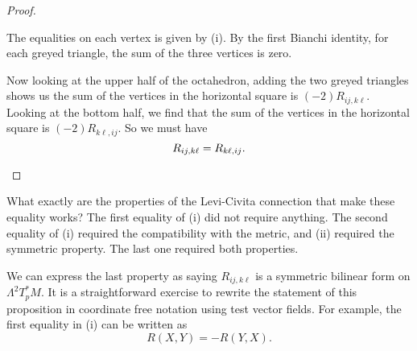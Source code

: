 \documentclass[a4paper]{article}
\begin{document}
\begin{proof}
\begin{enumerate}
\begin{center}
      \end{center}
      The equalities on each vertex is given by (i). By the first Bianchi identity, for each greyed triangle, the sum of the three vertices is zero.

      Now looking at the upper half of the octahedron, adding the two greyed triangles shows us the sum of the vertices in the horizontal square is $(-2) R_{ij, k\ell}$. Looking at the bottom half, we find that the sum of the vertices in the horizontal square is $(-2)R_{k\ell, ij}$. So we must have
      \[
        R_{ij, k\ell} = R_{k\ell, ij}.\qedhere
      \]
  \end{enumerate}
\end{proof}
What exactly are the properties of the Levi-Civita connection that make these equality works? The first equality of (i) did not require anything. The second equality of (i) required the compatibility with the metric, and (ii) required the symmetric property. The last one required both properties.

We can express the last property as saying $R_{ij, k\ell}$ is a symmetric bilinear form on $\Lambda^2 T_p^*M$. It is a straightforward exercise to rewrite the statement of this proposition in coordinate free notation using test vector fields. For example, the first equality in (i) can be written as
\[
  R(X, Y) = -R(Y, X).
\]
\end{document}
